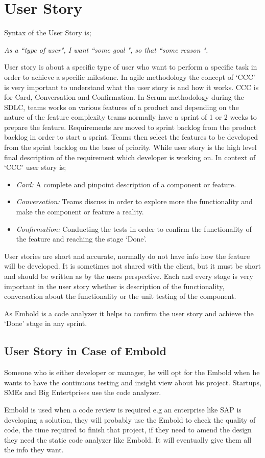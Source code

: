 \section{User Story}
Syntax of the User Story is; \par
\emph{As a ``type of user", I want  ``some goal ", so that ``some reason ".} ~\cite{story}\par
User story is about a specific type of user who want to perform a specific task in order to achieve a specific milestone. In agile methodology the concept of `CCC' is very important to understand what the user story is and how it works. CCC is for Card, Conversation and Confirmation. In Scrum methodology during the SDLC, teams works on various features of a product and depending on the nature of the feature complexity teams normally have a sprint of 1 or 2 weeks to prepare the feature. Requirements are moved to sprint backlog from the product backlog in order to start a sprint. Teams then select the features to be developed from the sprint backlog on the base of priority. While user story is the high level final description of the requirement which  developer is working on. In context of `CCC' user story is;
\begin{itemize}
\item\emph{Card:} A complete and pinpoint description of a component or feature. 
\item\emph{Conversation:} Teams discuss in order to explore more the functionality and make the component or feature a reality.
\item\emph{Confirmation:} Conducting the tests in order to confirm the functionality of the feature and reaching the stage `Done'.
\end{itemize}\par
User stories are short and accurate, normally do not have info how the feature will be developed. It is sometimes not shared with the client, but it must be short and should be written as by the users perspective. Each and every stage is very important in the user story whether is description of the functionality, conversation about the functionality or the unit testing of the component. ~\cite{Agile}\par
As Embold is a code analyzer it helps to confirm the user story and achieve the `Done' stage in any sprint.
\subsection{User Story in Case of Embold}
Someone who is either developer or manager, he will opt for the Embold when he wants to have the continuous testing and insight view about his project. Startups, SMEs and Big Entertprises use the code analyzer. \par Embold is used when a code review is required e.g an enterprise like SAP is developing a solution, they will probably use the Embold to check the quality of code,  the time required to finish that project, if they need to amend the design they need the static code analyzer like Embold. It will eventually give them all the info they want.\par
